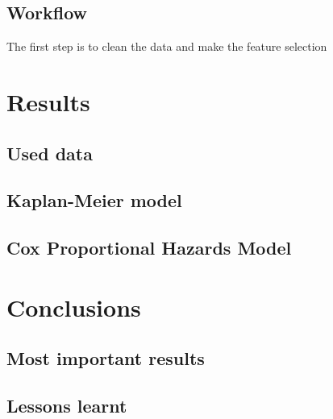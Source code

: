 \documentclass[11pt]{article} %
\begin{document}
\subsection{Workflow}

The first step is to clean the data and make the feature selection


\section{Results}

\subsection{Used data}

\subsection{Kaplan-Meier model}

\subsection{Cox Proportional Hazards Model}

\section{Conclusions}

\subsection{Most important results}

\subsection{Lessons learnt}
\end{document}
